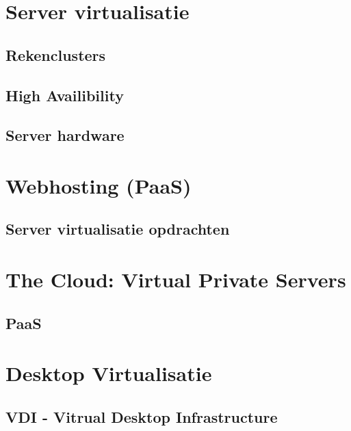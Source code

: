 \documentclass[a4paper,12pt,twoside,openright,titlepage]{book}
\begin{document}
\section{Server virtualisatie}

\subsection{Rekenclusters}

\subsection{High Availibility}

\subsection{Server hardware}

\section{Webhosting (PaaS)}
\subsection{Server virtualisatie opdrachten}

\section{The Cloud: Virtual Private Servers}

\subsection{PaaS}


\section{Desktop Virtualisatie}

\subsection{VDI - Vitrual Desktop Infrastructure}

\end{document}
